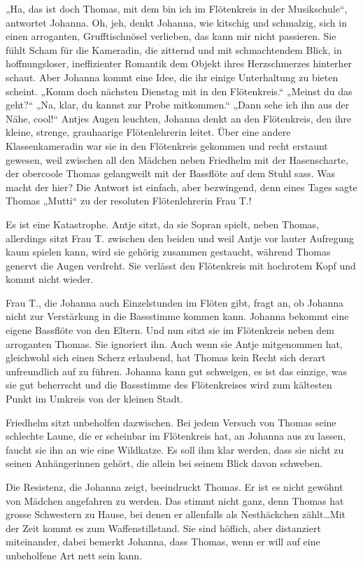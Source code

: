 \documentclass[10pt,titlepage,a5paper]{book}
\begin{document}
„Ha, das ist doch Thomas, mit dem bin ich im Flötenkreis in der Musikschule“, antwortet Johanna. Oh, jeh, denkt Johanna, wie kitschig und schmalzig, sich in einen arroganten, Grufftischnösel verlieben, das kann mir nicht passieren. Sie fühlt Scham für die Kameradin, die zitternd und mit schmachtendem Blick, in hoffnungsloser, ineffizienter Romantik dem Objekt ihres Herzschmerzes hinterher schaut. Aber Johanna kommt eine Idee, die ihr einige Unterhaltung zu bieten scheint. „Komm doch nächsten Dienstag mit in den Flötenkreis.“ „Meinst du das geht?“ „Na, klar, du kannst zur Probe mitkommen.“ „Dann sehe ich ihn aus der Nähe, cool!“ Antjes Augen leuchten, Johanna denkt an den Flötenkreis, den ihre kleine, strenge, grauhaarige Flötenlehrerin leitet. Über eine andere Klassenkameradin war sie in den Flötenkreis gekommen und recht erstaunt gewesen, weil zwischen all den Mädchen neben Friedhelm mit der Hasenscharte, der obercoole Thomas gelangweilt mit der Bassflöte auf dem Stuhl sass. Was macht der hier? Die Antwort  ist einfach, aber bezwingend, denn eines Tages sagte Thomas „Mutti“ zu der resoluten Flötenlehrerin Frau T.!

Es ist eine Katastrophe. Antje sitzt, da sie Sopran spielt, neben Thomas, allerdings sitzt Frau T. zwischen den beiden und weil Antje vor lauter Aufregung kaum spielen kann, wird sie gehörig zusammen gestaucht, während Thomas genervt die Augen verdreht. Sie verlässt den Flötenkreis mit hochrotem Kopf und kommt nicht wieder. 

Frau T., die Johanna auch Einzelstunden im Flöten gibt, fragt an, ob Johanna nicht zur Verstärkung in die Bassstimme kommen kann. Johanna bekommt eine eigene Bassflöte von den Eltern. Und nun sitzt sie im Flötenkreis neben dem arroganten Thomas. Sie ignoriert ihn. Auch wenn sie Antje mitgenommen hat, gleichwohl sich einen Scherz erlaubend, hat Thomas kein Recht sich derart unfreundlich auf zu führen. Johanna kann gut schweigen, es ist das einzige, was sie gut beherrscht und die Bassstimme des Flötenkreises  wird zum kältesten Punkt im Umkreis von der kleinen Stadt.

 Friedhelm sitzt unbeholfen dazwischen. Bei jedem Versuch von Thomas seine schlechte Laune, die er scheinbar im Flötenkreis hat, an Johanna aus zu lassen, faucht sie ihn an wie eine Wildkatze. Es soll ihm klar werden, dass sie nicht zu seinen Anhängerinnen gehört, die allein bei seinem Blick davon schweben. 

Die Resistenz, die Johanna zeigt, beeindruckt Thomas. Er ist es nicht gewöhnt von Mädchen angefahren zu werden. Das stimmt nicht ganz, denn Thomas hat grosse Schwestern zu Hause, bei denen er allenfalls als Nesthäckchen zählt\dots  Mit der Zeit kommt es zum Waffenstillstand. Sie sind höflich, aber distanziert miteinander, dabei bemerkt Johanna, dass Thomas, wenn er will auf eine unbeholfene Art nett sein kann.
\end{document}
